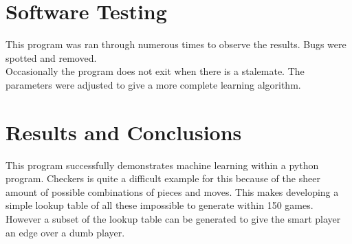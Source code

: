 \documentclass{article}
\begin{document}
\section{Software Testing}
\begin{description}
This program was ran through numerous times to observe the results. Bugs were spotted and removed. 
\\Occasionally the program does not exit when there is a stalemate.
The parameters were adjusted to give a more complete learning algorithm.
\end{description} 


\section{Results and Conclusions}

This program successfully demonstrates machine learning within a python program. Checkers is quite a difficult example for this because of the sheer amount of possible combinations of pieces and moves. This makes developing a simple lookup table of all these impossible to generate within 150 games. However a subset of the lookup table can be generated to give the smart player an edge over a dumb player.







\end{document}
